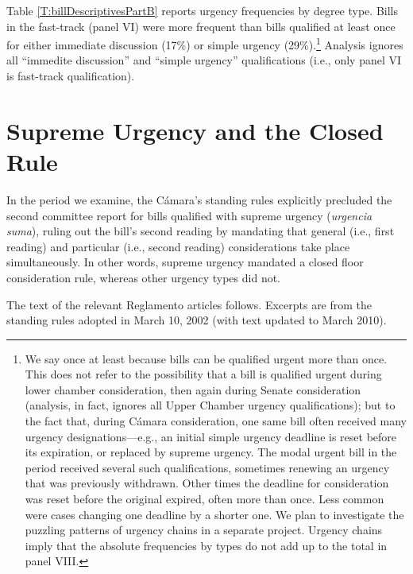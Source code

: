 \documentclass[letter,12pt]{article}
\begin{document}
Table \ref{T:billDescriptivesPartB} reports urgency frequencies by degree type. Bills in the fast-track (panel VI) were more frequent than bills qualified at least once for either immediate discussion (17\%) or simple urgency (29\%).\footnote{\label{fnNonExclusive}We say once at least because bills can be qualified urgent more than once. This does not refer to the possibility that a bill is qualified urgent during lower chamber consideration, then again during Senate consideration (analysis, in fact, ignores all Upper Chamber urgency qualifications); but to the fact that, during C\'amara consideration, one same bill often received many urgency designations---e.g., an initial simple urgency deadline is reset before its expiration, or replaced by supreme urgency. The modal urgent bill in the period received several such qualifications, sometimes renewing an urgency that was previously withdrawn. Other times the deadline for consideration was reset before the original expired, often more than once. Less common were cases changing one deadline by a shorter one. We plan to investigate the puzzling patterns of urgency chains in a separate project. Urgency chains imply that the absolute frequencies by types do not add up to the total in panel VIII.} Analysis ignores all ``immedite discussion'' and ``simple urgency'' qualifications (i.e., only panel VI is fast-track qualification). 

\section{Supreme Urgency and the Closed Rule}

In the period we examine, the C\'amara's standing rules explicitly precluded the second committee report for bills qualified with supreme urgency (\emph{urgencia suma}), ruling out the bill's second reading by mandating that general (i.e., first reading) and particular (i.e., second reading) considerations take place simultaneously. In other words, supreme urgency mandated a closed floor consideration rule, whereas other urgency types did not.

The text of the relevant Reglamento articles follows. Excerpts are from the standing rules adopted in March 10, 2002 (with text updated to March 2010).  
\end{document}
